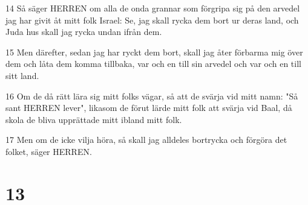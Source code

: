 \par 14 Så säger HERREN om alla de onda grannar som förgripa sig på den arvedel jag har givit åt mitt folk Israel: Se, jag skall rycka dem bort ur deras land, och Juda hus skall jag rycka undan ifrån dem.
\par 15 Men därefter, sedan jag har ryckt dem bort, skall jag åter förbarma mig över dem och låta dem komma tillbaka, var och en till sin arvedel och var och en till sitt land.
\par 16 Om de då rätt lära sig mitt folks vägar, så att de svärja vid mitt namn: "Så sant HERREN lever", likasom de förut lärde mitt folk att svärja vid Baal, då skola de bliva upprättade mitt ibland mitt folk.
\par 17 Men om de icke vilja höra, så skall jag alldeles bortrycka och förgöra det folket, säger HERREN.

\chapter{13}

